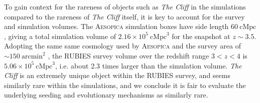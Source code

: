 \documentclass[fleqn,usenatbib]{mnras}
\newcommand{\cliff}{\textit{The Cliff}\xspace}
\begin{document}

To gain context for the rareness of objects such as \cliff in the simulations compared to the rareness of \cliff itself, it is key to account for the survey and simulation volumes.  
The \textsc{Aesopica} simulation boxes have side length $60 \ \mathrm{cMpc}$, giving a total simulation volume of $2.16 \times10^5 \ \mathrm{cMpc}^3$ for the snapshot at $z\sim3.5$. 
Adopting the same same cosmology used by \textsc{Aesopica} \citep[see][]{Henden2018} and the survey area of $\sim150 \ \mathrm{arcmin}^2$ \citep{RUBIES2025}, the RUBIES survey volume over the redshift range $3 < z < 4$  is $5.06 \times10^5 \ \mathrm{cMpc}^3$, i.e. about 2.3 times larger than the simulation volume. 
\cliff is an extremely unique object within the RUBIES survey, and seems similarly rare within the simulations, and we conclude it is fair to evaluate the underlying seeding and evolutionary mechanisms as similarly rare. 
\end{document}
